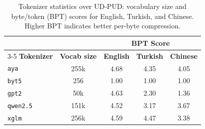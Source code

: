 \begin{table}[ht]
\small
\centering
\begin{tabular}{l c ccc}
\toprule
& & \multicolumn{3}{c}{\textbf{BPT Score}} \\
\cmidrule(lr){3-5}
\textbf{Tokenizer} & \textbf{Vocab size} & \textbf{English} & \textbf{Turkish} & \textbf{Chinese} \\
\midrule
\texttt{aya} & 255k & 4.68 & 4.35 & 4.05 \\
\texttt{byt5} & 256 & 1.00 & 1.00 & 1.00 \\
\texttt{gpt2} & 50k & 4.63 & 2.30 & 1.36 \\
\texttt{qwen2.5} & 151k & 4.52 & 3.17 & 3.67 \\
\texttt{xglm} & 256k & 4.59 & 4.47 & 3.38 \\
\bottomrule
\end{tabular}
\caption[Tokenizer statistics over UD-PUD]{Tokenizer statistics over UD-PUD: vocabulary size and byte/token (BPT) scores for English, Turkish, and Chinese. Higher BPT indicates better per-byte compression.}
\label{tab:fertility}
\end{table}
